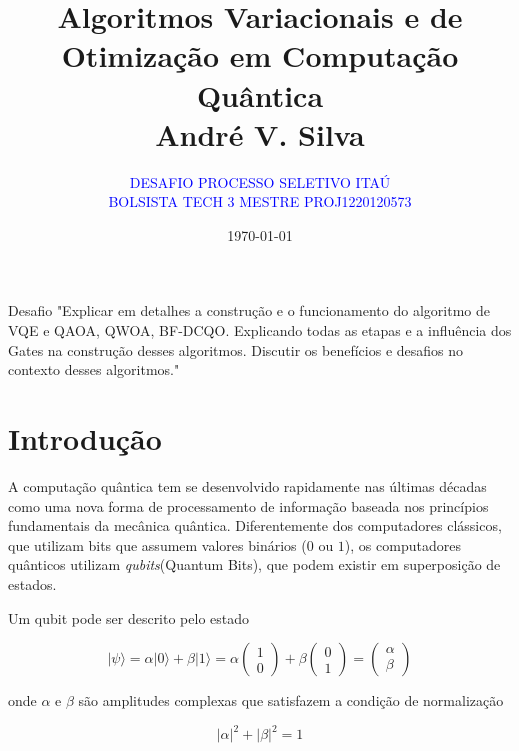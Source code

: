\documentclass[a4paper,12pt]{article}
\title{Algoritmos Variacionais e de Otimização em Computação Quântica \\ Andr\'e V. Silva}
\author{\textcolor{blue}{DESAFIO PROCESSO SELETIVO ITAÚ} \\ \textcolor{blue}{BOLSISTA TECH 3 MESTRE PROJ1220120573}}
\date{\today}
\begin{document}
\begin{Proof}{Desafio}{}
"Explicar em detalhes a construção e o funcionamento do algoritmo de VQE e QAOA, QWOA, BF-DCQO.
Explicando todas as etapas e a influência dos Gates na construção desses algoritmos. 
Discutir os benefícios e desafios no contexto desses algoritmos."
\end{Proof}

\maketitle
\thispagestyle{fancy}

\tableofcontents

\newpage

\section{Introdução}

A \colorbox{yellow!30}{computação quântica}\cite{drinko2024variational} tem se desenvolvido rapidamente nas últimas décadas 
como uma nova forma de \colorbox{blue!20}{processamento de informação} baseada nos princípios 
fundamentais da \colorbox{blue!20}{mecânica quântica}\cite{cohen2019quantum, sakurai2020modern}. Diferentemente dos \colorbox{green!20}{computadores clássicos}, 
que utilizam bits que assumem valores \colorbox{green!20}{binários ($0$ ou $1$)}, os \colorbox{red!20}{computadores 
quânticos} utilizam \colorbox{red!20}{\textit{qubits}}(Quantum Bits), que podem existir em \colorbox{yellow!20}{superposição de estados}.

Um qubit pode ser descrito pelo estado

\begin{equation}
|\psi\rangle = \alpha |0\rangle + \beta |1\rangle = 
\alpha
\begin{pmatrix}
1 \\
0
\end{pmatrix}
+
\beta
\begin{pmatrix}
0 \\
1
\end{pmatrix}
=
\begin{pmatrix}
\alpha \\
\beta
\end{pmatrix}
\end{equation}

onde $\alpha$ e $\beta$ são amplitudes complexas que satisfazem a \colorbox{yellow!20}{condição de normalização}

\begin{equation}
\boxed{
|\alpha|^2 + |\beta|^2 = 1
}
\end{equation}
\end{document}
